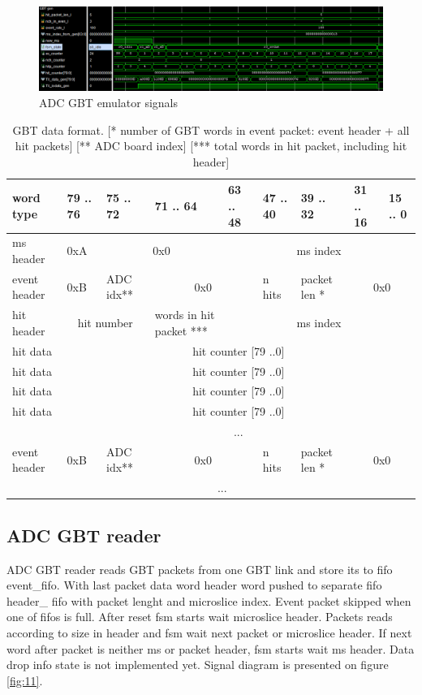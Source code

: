 \documentclass{article}
\begin{document}
\begin{figure}[H]
	\centering 
	\includegraphics[width=1.0\textwidth]{ADC_GBT_emu_waves.png}
	\caption{\label{fig:9} ADC GBT emulator signals}
\end{figure}

\begin{table}[H]
\centering
\begin{tabular}{| l | l | l | l | l | l | l | l | l |}
\hline
word type & 79 .. 76 & 75 .. 72 & 71 .. 64 & 63 .. 48 & 47 .. 40 & 39 .. 32 & 31 .. 16 & 15 .. 0 \\ \hline
ms header & 0xA & \multicolumn{2}{c|}{0x0}  & \multicolumn{5}{c|}{ms index} \\ \hline
event header & 0xB & ADC idx** & \multicolumn{2}{c|}{0x0} & n hits & packet len * & \multicolumn{2}{c|}{0x0} \\ \hline
hit header & \multicolumn{2}{c|}{hit number} & words in hit packet *** & \multicolumn{5}{c|}{ms index} \\ \hline
hit data & \multicolumn{8}{c|}{hit counter [79 ..0]} \\ \hline
hit data & \multicolumn{8}{c|}{hit counter [79 ..0]} \\ \hline
hit data & \multicolumn{8}{c|}{hit counter [79 ..0]} \\ \hline
hit data & \multicolumn{8}{c|}{hit counter [79 ..0]} \\ \hline
  & \multicolumn{8}{c|}{ ... } \\ \hline

event header & 0xB & ADC idx** & \multicolumn{2}{c|}{0x0} & n hits & packet len * & \multicolumn{2}{c|}{0x0} \\ \hline
  & \multicolumn{7}{c|}{ ... } \\ \hline

\end{tabular}
\caption{GBT data format. [* number of GBT words in event packet: event header + all hit packets] [** ADC board index] [*** total words in hit packet, including hit header]\label{tab10}}
\end{table}


\subsection{ADC GBT reader}
ADC GBT reader reads GBT packets from one GBT link and store its to fifo event\_fifo. With last packet data word header word pushed to separate fifo header\_ fifo with packet lenght and microslice index. Event packet skipped when one of fifos is full. After reset fsm starts wait microslice header. Packets reads according to size in header and fsm wait next packet or microslice header. If next word after packet is neither ms or packet header, fsm starts wait ms header. Data drop info state is not implemented yet. Signal diagram is presented on figure \ref{fig:11}. 
\end{document}
